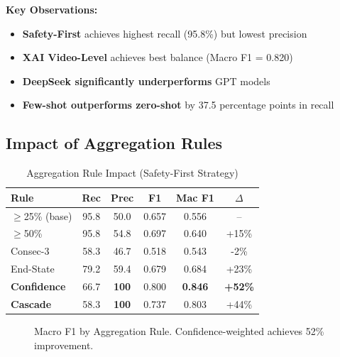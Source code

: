 \documentclass[conference]{IEEEtran}
\begin{document}
\textbf{Key Observations:}
\begin{itemize}[leftmargin=*]
    \item \textbf{Safety-First} achieves highest recall (95.8\%) but lowest precision
    \item \textbf{XAI Video-Level} achieves best balance (Macro F1 = 0.820)
    \item \textbf{DeepSeek significantly underperforms} GPT models
    \item \textbf{Few-shot outperforms zero-shot} by 37.5 percentage points in recall
\end{itemize}

\subsection{Impact of Aggregation Rules}

\begin{table}[H]
\centering
\caption{Aggregation Rule Impact (Safety-First Strategy)}
\label{tab:aggregation}
\begin{tabular}{lccccc}
\toprule
\textbf{Rule} & \textbf{Rec} & \textbf{Prec} & \textbf{F1} & \textbf{Mac F1} & $\Delta$ \\
\midrule
$\geq$25\% (base) & 95.8 & 50.0 & 0.657 & 0.556 & -- \\
$\geq$50\% & 95.8 & 54.8 & 0.697 & 0.640 & +15\% \\
Consec-3 & 58.3 & 46.7 & 0.518 & 0.543 & -2\% \\
End-State & 79.2 & 59.4 & 0.679 & 0.684 & +23\% \\
\textbf{Confidence} & 66.7 & \textbf{100} & 0.800 & \textbf{0.846} & \textbf{+52\%} \\
\textbf{Cascade} & 58.3 & \textbf{100} & 0.737 & 0.803 & +44\% \\
\bottomrule
\end{tabular}
\end{table}

\begin{figure}[H]
\centering
{}
\caption{Macro F1 by Aggregation Rule. Confidence-weighted achieves 52\% improvement.}
\label{fig:aggregation_impact}
\end{figure}
\end{document}
